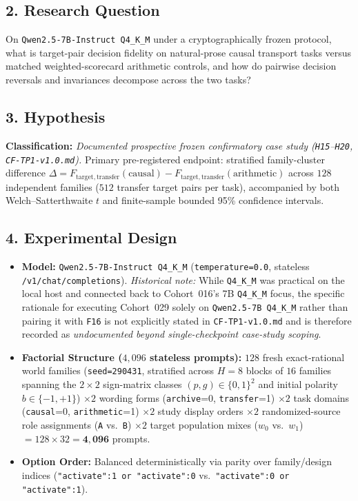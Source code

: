 \subsection*{2. Research Question}
On \texttt{Qwen2.5-7B-Instruct Q4\_K\_M} under a cryptographically frozen protocol, what is target-pair decision fidelity on natural-prose causal transport tasks versus matched weighted-scorecard arithmetic controls, and how do pairwise decision reversals and invariances decompose across the two tasks?

\subsection*{3. Hypothesis}
\textbf{Classification:} \emph{Documented prospective frozen confirmatory case study (\texttt{H15}--\texttt{H20}, \texttt{CF-TP1-v1.0.md}).} Primary pre-registered endpoint: stratified family-cluster difference $\Delta = F_{\mathrm{target,transfer}}(\text{causal}) - F_{\mathrm{target,transfer}}(\text{arithmetic})$ across $128$ independent families ($512$ transfer target pairs per task), accompanied by both Welch--Satterthwaite $t$ and finite-sample bounded 95\% confidence intervals.

\subsection*{4. Experimental Design}
\begin{itemize}
  \item \textbf{Model:} \texttt{Qwen2.5-7B-Instruct Q4\_K\_M} (\texttt{temperature=0.0}, stateless \texttt{/v1/chat/completions}). \emph{Historical note:} While \texttt{Q4\_K\_M} was practical on the local host and connected back to Cohort~016's 7B \texttt{Q4\_K\_M} focus, the specific rationale for executing Cohort~029 solely on \texttt{Qwen2.5-7B Q4\_K\_M} rather than pairing it with \texttt{F16} is not explicitly stated in \texttt{CF-TP1-v1.0.md} and is therefore recorded as \emph{undocumented beyond single-checkpoint case-study scoping}.
  \item \textbf{Factorial Structure ($4{,}096$ stateless prompts):} $128$ fresh exact-rational world families (\texttt{seed=290431}, stratified across $H=8$ blocks of $16$ families spanning the $2\times 2$ sign-matrix classes $(p,g)\in\{0,1\}^2$ and initial polarity $b\in\{-1,+1\}$) $\times 2$ wording forms (\texttt{archive}=0, \texttt{transfer}=1) $\times 2$ task domains (\texttt{causal}=0, \texttt{arithmetic}=1) $\times 2$ study display orders $\times 2$ randomized-source role assignments (\texttt{A} vs.\ \texttt{B}) $\times 2$ target population mixes ($w_0$ vs.\ $w_1$) $= 128 \times 32 = \mathbf{4{,}096}$ prompts.
  \item \textbf{Option Order:} Balanced deterministically via parity over family/design indices (\texttt{{"activate":1} or {"activate":0}} vs.\ \texttt{{"activate":0} or {"activate":1}}).
\end{itemize}


